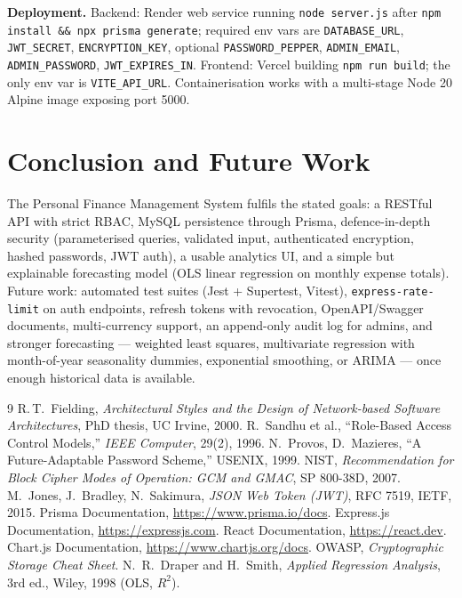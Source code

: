 \documentclass[11pt,a4paper]{article}
\newcommand{\code}[1]{\texttt{\small #1}}
\begin{document}
\textbf{Deployment.} Backend: Render web service running
\code{node server.js} after \code{npm install \&\& npx prisma generate};
required env vars are \code{DATABASE\_URL}, \code{JWT\_SECRET},
\code{ENCRYPTION\_KEY}, optional \code{PASSWORD\_PEPPER},
\code{ADMIN\_EMAIL}, \code{ADMIN\_PASSWORD}, \code{JWT\_EXPIRES\_IN}.
Frontend: Vercel building \code{npm run build}; the only env var is
\code{VITE\_API\_URL}. Containerisation works with a multi-stage Node
20 Alpine image exposing port 5000.

\section{Conclusion and Future Work}
The Personal Finance Management System fulfils the stated goals: a
RESTful API with strict RBAC, MySQL persistence through Prisma,
defence-in-depth security (parameterised queries, validated input,
authenticated encryption, hashed passwords, JWT auth), a usable
analytics UI, and a simple but explainable forecasting model (OLS
linear regression on monthly expense totals). Future work: automated
test suites (Jest + Supertest, Vitest), \code{express-rate-limit} on
auth endpoints, refresh tokens with revocation, OpenAPI/Swagger
documents, multi-currency support, an append-only audit log for
admins, and stronger forecasting --- weighted least squares,
multivariate regression with month-of-year seasonality dummies,
exponential smoothing, or ARIMA --- once enough historical data is
available.

\begin{thebibliography}{9}\small
{} R.\,T.\ Fielding, \textit{Architectural Styles and the Design of Network-based Software Architectures}, PhD thesis, UC Irvine, 2000.
 R.\ Sandhu et al., ``Role-Based Access Control Models,'' \textit{IEEE Computer}, 29(2), 1996.
 N.\ Provos, D.\ Mazieres, ``A Future-Adaptable Password Scheme,'' USENIX, 1999.
 NIST, \textit{Recommendation for Block Cipher Modes of Operation: GCM and GMAC}, SP 800-38D, 2007.
 M.\ Jones, J.\ Bradley, N.\ Sakimura, \textit{JSON Web Token (JWT)}, RFC 7519, IETF, 2015.
 Prisma Documentation, \url{https://www.prisma.io/docs}.
 Express.js Documentation, \url{https://expressjs.com}.
 React Documentation, \url{https://react.dev}.
 Chart.js Documentation, \url{https://www.chartjs.org/docs}.
 OWASP, \textit{Cryptographic Storage Cheat Sheet}.
 N.\ R.\ Draper and H.\ Smith, \textit{Applied Regression Analysis}, 3rd ed., Wiley, 1998 (OLS, $R^2$).
\end{thebibliography}
\end{document}
